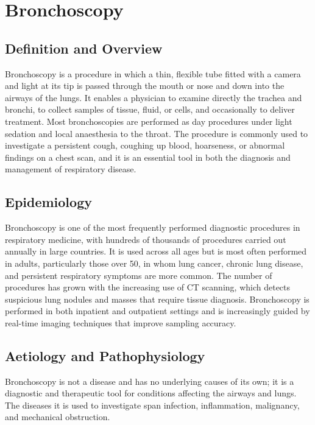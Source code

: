 \chapter{Bronchoscopy}

\section*{Definition and Overview}
Bronchoscopy is a procedure in which a thin, flexible tube fitted with a camera and light at its tip is passed through the mouth or nose and down into the airways of the lungs. It enables a physician to examine directly the trachea and bronchi, to collect samples of tissue, fluid, or cells, and occasionally to deliver treatment. Most bronchoscopies are performed as day procedures under light sedation and local anaesthesia to the throat. The procedure is commonly used to investigate a persistent cough, coughing up blood, hoarseness, or abnormal findings on a chest scan, and it is an essential tool in both the diagnosis and management of respiratory disease.

\section*{Epidemiology}
Bronchoscopy is one of the most frequently performed diagnostic procedures in respiratory medicine, with hundreds of thousands of procedures carried out annually in large countries. It is used across all ages but is most often performed in adults, particularly those over 50, in whom lung cancer, chronic lung disease, and persistent respiratory symptoms are more common. The number of procedures has grown with the increasing use of CT scanning, which detects suspicious lung nodules and masses that require tissue diagnosis. Bronchoscopy is performed in both inpatient and outpatient settings and is increasingly guided by real-time imaging techniques that improve sampling accuracy.

\section*{Aetiology and Pathophysiology}
Bronchoscopy is not a disease and has no underlying causes of its own; it is a diagnostic and therapeutic tool for conditions affecting the airways and lungs. The diseases it is used to investigate span infection, inflammation, malignancy, and mechanical obstruction.

